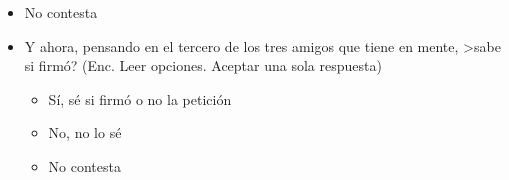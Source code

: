 \documentclass[12pt]{article}
\begin{document}
\begin{enumerate}
\begin{itemize}
\begin{itemize}
\item No contesta
\end{itemize}
\end{itemize}
\begin{itemize}
\item Y ahora, pensando en el tercero de los tres amigos que tiene en mente, >sabe si firm\'{o}? (Enc. Leer opciones. Aceptar una sola respuesta)
\begin{itemize}
\item S\'{i}, s\'{e} si firm\'{o} o no la petici\'{o}n
\item No, no lo s\'{e}
\item No contesta
\end{itemize}
\end{itemize}
\end{enumerate}
\end{document}

